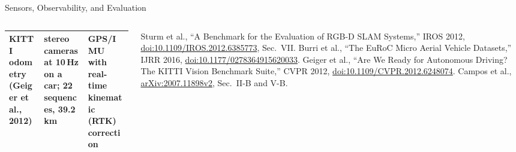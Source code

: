 \begin{frame}{Sensors, Observability, and Evaluation}
\begin{columns}[T,onlytextwidth]
{\begin{tabular}{>{\raggedright\arraybackslash}p{1.5cm} >{\raggedright\arraybackslash}p{2.8cm} >{\raggedright\arraybackslash}p{2.2cm}}
        \addlinespace[0.2em]
        KITTI odometry (Geiger et al., 2012) & stereo cameras at 10\,Hz on a car; 22 sequences, 39.2\,km & GPS/IMU with real-time kinematic (RTK) correction \\
        \bottomrule
      \end{tabular}\par}
      \vspace{0.5em}
      {\scriptsize Sturm et al., ``A Benchmark for the Evaluation of RGB-D SLAM Systems,'' IROS 2012, \href{https://doi.org/10.1109/IROS.2012.6385773}{doi:10.1109/IROS.2012.6385773}, Sec.~VII. Burri et al., ``The EuRoC Micro Aerial Vehicle Datasets,'' IJRR 2016, \href{https://doi.org/10.1177/0278364915620033}{doi:10.1177/0278364915620033}. Geiger et al., ``Are We Ready for Autonomous Driving? The KITTI Vision Benchmark Suite,'' CVPR 2012, \href{https://doi.org/10.1109/CVPR.2012.6248074}{doi:10.1109/CVPR.2012.6248074}. Campos et al., \href{https://arxiv.org/abs/2007.11898v2}{arXiv:2007.11898v2}, Sec.~II-B and V-B.\par}
  \end{columns}
\end{frame}


